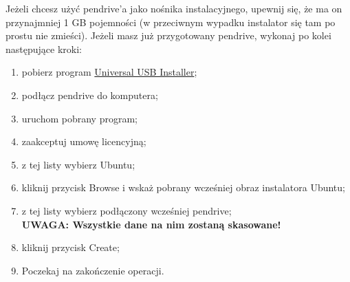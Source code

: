 Jeżeli chcesz użyć pendrive'a jako nośnika instalacyjnego, upewnij się, że ma on przynajmniej 1 GB pojemności (w przeciwnym wypadku instalator się tam po prostu nie zmieści). Jeżeli masz już przygotowany pendrive, wykonaj po kolei następujące kroki:

\begin{enumerate}[label=\protect\circled{\arabic*}]
\item pobierz program \href{http://www.pendrivelinux.com/downloads/Universal-USB-Installer/Universal-USB-Installer-1.9.5.2.exe}{Universal USB Installer};
\item podłącz pendrive do komputera;
\item uruchom pobrany program;
\item zaakceptuj umowę licencyjną;
\item z tej listy wybierz Ubuntu;
\item kliknij przycisk \textcolor{ubuntu_orange}{Browse} i wskaż pobrany wcześniej obraz instalatora Ubuntu;
\item z tej listy wybierz podłączony wcześniej pendrive;\\
\textbf{UWAGA: Wszystkie dane na nim zostaną skasowane!}
\item kliknij przycisk \textcolor{ubuntu_orange}{Create};
\item Poczekaj na zakończenie operacji.
\end{enumerate}

